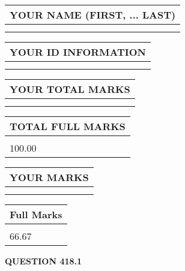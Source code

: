 \documentclass{ctexart}
\begin{document}
   
   
   
\newpage 
\setcounter{page}{ 
   418001 } 
   
   
   
   
\noindent\begin{tabular}{|l|}
\hline
YOUR NAME (FIRST, ... LAST)  \\
\hline
 \\ 
 \\ 
\hline
\end{tabular}
\hspace{0.05in} \begin{tabular}{|l|}
\hline
 YOUR   ID   INFORMATION  \\
\hline
 \\ 
 \\ 
\hline
\end{tabular}
   
   
\vspace{0.2in}\noindent\begin{tabular}{|l|}
\hline
YOUR TOTAL MARKS  \\
\hline
 \\ 
 \\ 
\hline
\end{tabular}
\hspace{0.05in} \begin{tabular}{|l|}
\hline
TOTAL FULL MARKS  \\
\hline
 \\ 
100.00 \\
\hline
\end{tabular}
   
   
 \vspace{0.2in}
 
 
 
 
   
   
  
\vspace{0.2in}
  
\noindent\begin{tabular}{|l|}
\hline
 YOUR MARKS  \\
\hline
 \\ 
 \\ 
\hline
\end{tabular}
\hspace{0.05in} \begin{tabular}{|l|}
\hline
 Full Marks  \\
\hline
 \\ 
66.67 \\
\hline
\end{tabular}
{\textbf{\Large{QUESTION
418.1 
}}}
  
\end{document}
